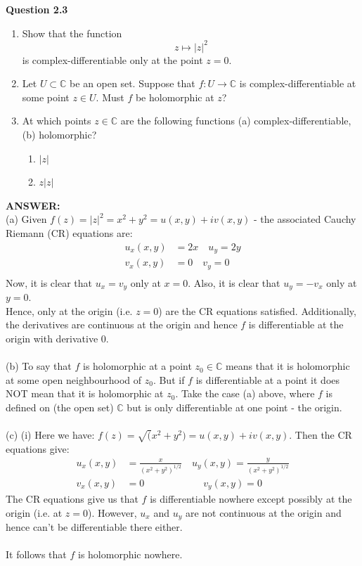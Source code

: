 \documentclass[12pt,a4paper]{article}
\newcommand{\question}[2]{\textbf{Question #1}\quad #2}
\begin{document}
\question{2.3}{
\begin{enumerate}[label=(\alph*)]
    \item Show that the function
    \[
    z \mapsto |z|^2
    \]
    is complex-differentiable only at the point $z=0$.

    \item Let $U \subset \mathbb{C}$ be an open set. Suppose that
    $f:U\to\mathbb{C}$ is complex-differentiable at some point
    $z\in U$. Must $f$ be holomorphic at $z$?

    \item At which points $z\in\mathbb{C}$ are the following functions
    (a) complex-differentiable, (b) holomorphic?
    
    \begin{enumerate}[label=(\roman*)]
        \item $|z|$
        \item $z|z|$
    \end{enumerate}
\end{enumerate}
}

\vspace{1cm}

\textbf{ANSWER:} \\
(a) Given $f(z) = |z|^2 = x^2 + y^2 = u(x,y) + i v(x,y)$ - the associated Cauchy Riemann (CR) equations are:
\begin{align*}
    u_x(x,y) &= 2x \quad u_y = 2y \\
    v_x(x,y) &= 0 \quad v_y = 0 \\
\end{align*}
Now, it is clear that $u_x = v_y$ only at $x=0$.  Also, it is clear that $u_y = -v_x$ only at $y=0$.\\
Hence, only at the origin (i.e. $z=0$) are the CR equations satisfied.  Additionally, the derivatives are continuous at the origin
and hence $f$ is differentiable at the origin with derivative 0.\\
\\
(b) To say that $f$ is holomorphic at a point $z_0 \in \mathbb{C}$ means that it is holomorphic at some open neighbourhood of $z_0$.
But if $f$ is differentiable at a point it does NOT mean that it is holomorphic at $z_0$.
Take the case (a) above, where $f$ is defined on (the open set) $\mathbb{C}$ but is only differentiable at one point - the origin.\\
\\
(c) (i) Here we have: $f(z) = \sqrt(x^2 + y^2) = u(x,y) + i v(x,y)$.  Then the CR equations give:
\begin{align*}
    u_x(x,y) &= \frac{x}{(x^2 + y^2)^{1/2}} \quad u_y(x,y) = \frac{y}{(x^2 + y^2)^{1/2}} \\
    v_x(x,y) &= 0 \quad\quad\quad\quad\quad\quad v_y(x,y) = 0
\end{align*}
The CR equations give us that $f$ is differentiable nowhere except possibly at the origin (i.e. at $z=0$).  However, $u_x$ and $u_y$ are not continuous
at the origin and hence can't be differentiable there either.\\
\\
It follows that $f$ is holomorphic nowhere.\\
\end{document}
